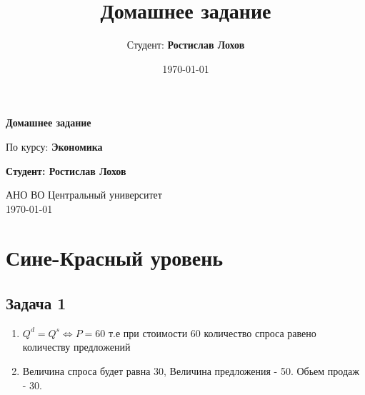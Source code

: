 \documentclass[a4paper,12pt]{article}
\title{Домашнее задание}
\author{Студент: \textbf{Ростислав Лохов}}
\date{\today}
\begin{document}
\begin{titlepage}
    \centering
    \vspace*{1cm}

    \Huge
    \textbf{Домашнее задание}

    \vspace{0.5cm}
    \LARGE
    По курсу: \textbf{Экономика}

    \vspace{1.5cm}

    \textbf{Студент: Ростислав Лохов}

    \vfill

    \Large
    АНО ВО Центральный университет\\
    \vspace{0.3cm}
    \today

\end{titlepage}

\tableofcontents
\newpage

\section{Сине-Красный уровень}


\subsection{Задача 1}
\begin{enumerate}
    \item $Q^d=Q^s \Leftrightarrow P=60$ т.е при стоимости 60 количество спроса равено количеству предложений
    \item Величина спроса будет равна 30, Величина предложения - 50. Обьем продаж - 30.
\end{enumerate}
\end{document}
